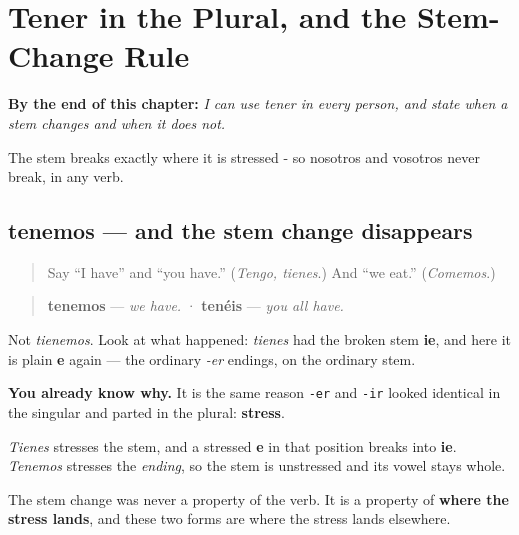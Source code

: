 
\chapter{Tener in the Plural, and the Stem-Change Rule}
\label{ch:spanish-tener-plural}

\begin{chapteropening}
\textbf{By the end of this chapter:} \emph{I can use tener in every person, and state when a stem changes and when it does not.}

The stem breaks exactly where it is stressed - so nosotros and vosotros never break, in any verb.
\end{chapteropening}

\section[tenemos · tenéis]{tenemos — and the stem change disappears}

\label{lesson:ES-C08-tenemos}



\begin{quote}
Say \textquotedblleft{}I have\textquotedblright{} and \textquotedblleft{}you have.\textquotedblright{} (\emph{Tengo, tienes}.) And \textquotedblleft{}we eat.\textquotedblright{} (\emph{Comemos}.)
\end{quote}

\begin{grammarlens}[title={Grammar Lens: the break is gone}]
\begin{quote}
\textbf{tenemos} — \emph{we have.}  ·  \textbf{tenéis} — \emph{you all have.}
\end{quote}

Not \emph{tienemos}. Look at what happened: \emph{tienes} had the broken stem \textbf{ie}, and here it is plain \textbf{e} again — the ordinary \emph{-er} endings, on the ordinary stem.

\textbf{You already know why.} It is the same reason \texttt{-er} and \texttt{-ir} looked identical in the singular and parted in the plural: \textbf{stress}.

\emph{Tienes} stresses the stem, and a stressed \textbf{e} in that position breaks into \textbf{ie}. \emph{Tenemos} stresses the \emph{ending}, so the stem is unstressed and its vowel stays whole.

The stem change was never a property of the verb. It is a property of \textbf{where the stress lands}, and these two forms are where the stress lands elsewhere.
\end{grammarlens}

